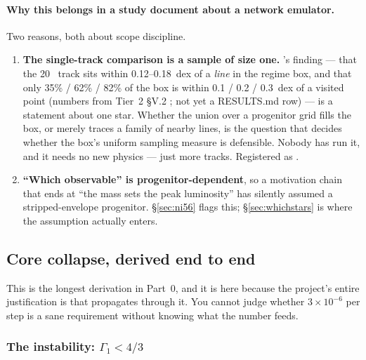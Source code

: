 \paragraph{Why this belongs in a study document about a network emulator.} Two
reasons, both about scope discipline.

\begin{enumerate}
\item \textbf{The single-track comparison is a sample of size one.}
  's finding --- that the 20~\Msun{} track sits within
  0.12--0.18~dex of a \emph{line} in the regime box, and that only 35\% / 62\% /
  82\% of the box is within 0.1 / 0.2 / 0.3~dex of a visited point (numbers
  from Tier~2 \S V.2 \derivedthere; not yet a RESULTS.md row) --- is a
  statement about one star. Whether the union over a progenitor grid fills the
  box, or merely traces a family of nearby lines, is the question that decides
  whether the box's uniform sampling measure is defensible. Nobody has run it,
  and it needs no new physics --- just more tracks. Registered as .
\item \textbf{``Which observable'' is progenitor-dependent}, so a motivation
  chain that ends at ``the  mass sets the peak luminosity'' has
  silently assumed a stripped-envelope progenitor. \S\ref{sec:ni56} flags this;
  \S\ref{sec:whichstars} is where the assumption actually enters.
\end{enumerate}

\subsection{Core collapse, derived end to end}
\label{sec:corecollapse}

This is the longest derivation in Part~0, and it is here because the project's
entire justification is that \Ye{} propagates through it. You cannot judge
whether $3 \times 10^{-6}$ per step is a sane requirement without knowing what
the number feeds.

\subsubsection{The instability: \texorpdfstring{$\Gamma_1 < 4/3$}{Gamma1 < 4/3}}
\label{sec:gamma43}


